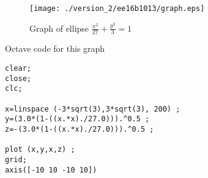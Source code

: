 

\begin{figure}[h]
\centering
\texttt{[image: ./version\_2/ee16b1013/graph.eps]}
\caption{Graph of ellipse $\displaystyle\frac{x^2}{27} +  \frac{y^2}{3} = 1$ }
\end{figure}


Octave code for this graph
\begin{lstlisting}[frame=single]
clear;
close;
clc;

x=linspace (-3*sqrt(3),3*sqrt(3), 200) ;
y=(3.0*(1-((x.*x)./27.0))).^0.5 ;
z=-(3.0*(1-((x.*x)./27.0))).^0.5 ;

plot (x,y,x,z) ;
grid;
axis([-10 10 -10 10])
\end{lstlisting}
%


